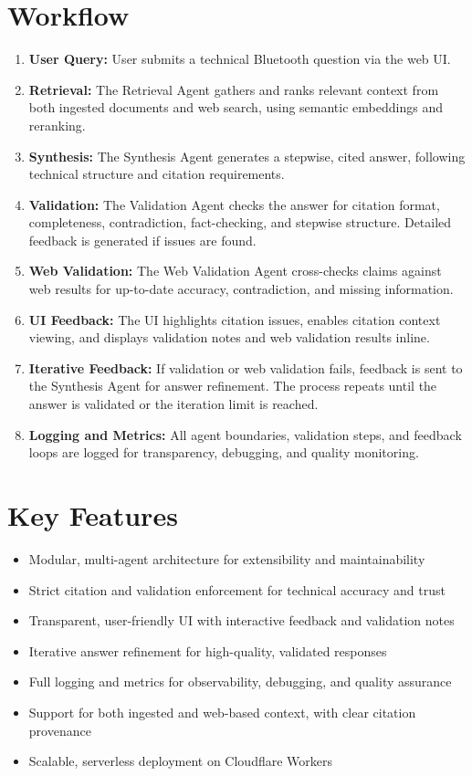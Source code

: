 \documentclass{article}
\begin{document}
\section*{Workflow}
\begin{enumerate}[leftmargin=*, itemsep=0.5em]
  \item \textbf{User Query:} User submits a technical Bluetooth question via the web UI.
  \item \textbf{Retrieval:} The Retrieval Agent gathers and ranks relevant context from both ingested documents and web search, using semantic embeddings and reranking.
  \item \textbf{Synthesis:} The Synthesis Agent generates a stepwise, cited answer, following technical structure and citation requirements.
  \item \textbf{Validation:} The Validation Agent checks the answer for citation format, completeness, contradiction, fact-checking, and stepwise structure. Detailed feedback is generated if issues are found.
  \item \textbf{Web Validation:} The Web Validation Agent cross-checks claims against web results for up-to-date accuracy, contradiction, and missing information.
  \item \textbf{UI Feedback:} The UI highlights citation issues, enables citation context viewing, and displays validation notes and web validation results inline.
  \item \textbf{Iterative Feedback:} If validation or web validation fails, feedback is sent to the Synthesis Agent for answer refinement. The process repeats until the answer is validated or the iteration limit is reached.
  \item \textbf{Logging and Metrics:} All agent boundaries, validation steps, and feedback loops are logged for transparency, debugging, and quality monitoring.
\end{enumerate}

\section*{Key Features}
\begin{itemize}[leftmargin=*, itemsep=0.5em]
  \item Modular, multi-agent architecture for extensibility and maintainability
  \item Strict citation and validation enforcement for technical accuracy and trust
  \item Transparent, user-friendly UI with interactive feedback and validation notes
  \item Iterative answer refinement for high-quality, validated responses
  \item Full logging and metrics for observability, debugging, and quality assurance
  \item Support for both ingested and web-based context, with clear citation provenance
  \item Scalable, serverless deployment on Cloudflare Workers
\end{itemize}
\end{document}

